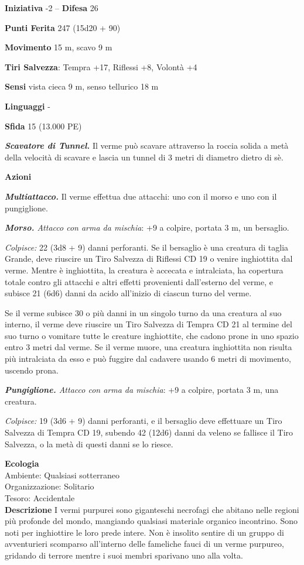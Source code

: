 \begin{multicols}{2}
\textbf{Iniziativa} -2 -- \textbf{Difesa} 26

\textbf{Punti Ferita} 247 (15d20 + 90)

\textbf{Movimento} 15 m, scavo 9 m

\textbf{Tiri Salvezza}: Tempra +17, Riflessi +8, Volontà +4

\textbf{Sensi} vista cieca 9 m, senso tellurico 18 m

\textbf{Linguaggi} -

\textbf{Sfida} 15 (13.000 PE)

\emph{\textbf{Scavatore di Tunnel.}} Il verme può scavare attraverso la roccia solida a metà della velocità di scavare e lascia un tunnel di 3 metri di diametro dietro di sè.

\textbf{Azioni}

\emph{\textbf{Multiattacco.}} Il verme effettua due attacchi: uno con il morso e uno con il pungiglione.

\emph{\textbf{Morso.} Attacco con arma da mischia}: +9 a colpire,
portata 3 m, un bersaglio.

\emph{Colpisce:} 22 (3d8 + 9) danni perforanti. Se il bersaglio è una creatura di taglia Grande, deve riuscire un Tiro Salvezza di Riflessi CD 19 o venire inghiottita dal verme. Mentre è inghiottita, la creatura è accecata e intralciata, ha copertura totale contro gli attacchi e altri effetti provenienti dall'esterno del verme, e subisce 21 (6d6) danni da acido all'inizio di ciascun turno del verme.

Se il verme subisce 30 o più danni in un singolo turno da una creatura al suo interno, il verme deve riuscire un Tiro Salvezza di Tempra CD 21 al termine del suo turno o vomitare tutte le creature inghiottite, che cadono prone in uno spazio entro 3 metri dal verme. Se il verme muore, una creatura inghiottita non risulta più intralciata da esso e può fuggire dal cadavere usando 6 metri di movimento, uscendo prona.

\emph{\textbf{Pungiglione.} Attacco con arma da mischia}: +9 a colpire, portata 3 m, una creatura.

\emph{Colpisce:} 19 (3d6 + 9) danni perforanti, e il bersaglio deve effettuare un Tiro Salvezza di Tempra CD 19, subendo 42 (12d6) danni da veleno se fallisce il Tiro Salvezza, o la metà di questi danni se lo riesce.

\textbf{Ecologia}\\
Ambiente: Qualsiasi sotterraneo\\
Organizzazione: Solitario\\
Tesoro: Accidentale\\
\textbf{Descrizione}
I vermi purpurei sono giganteschi necrofagi che abitano nelle regioni più profonde del mondo, mangiando qualsiasi materiale organico incontrino. Sono noti per inghiottire le loro prede intere. Non è insolito sentire di un gruppo di avventurieri scomparso all'interno delle fameliche fauci di un verme purpureo, gridando di terrore mentre i suoi membri sparivano uno alla volta.\\


\end{multicols}
